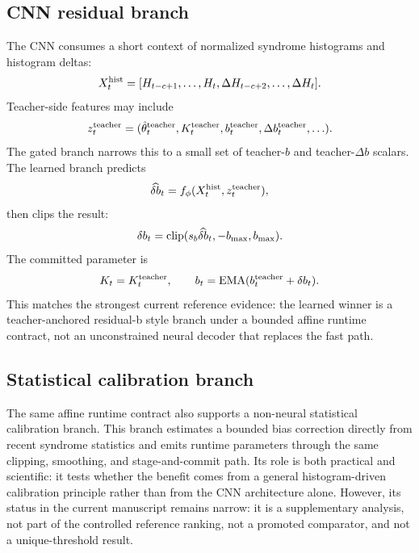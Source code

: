 \documentclass[11pt]{article}
\begin{document}
\subsection{CNN residual branch}

The CNN consumes a short context of normalized syndrome histograms and
histogram deltas:
\begin{equation}
    X_t^{\rm hist}=[H_{t-c+1},\ldots,H_t,\Delta H_{t-c+2},\ldots,\Delta H_t].
\end{equation}
Teacher-side features may include
\begin{equation}
    z_t^{\rm teacher}
    =
    (\hat{\theta}_t^{\rm teacher},
     K_t^{\rm teacher},
     b_t^{\rm teacher},
     \Delta b_t^{\rm teacher},\ldots).
\end{equation}
The gated branch narrows this to a small set of teacher-\(b\) and
teacher-\(\Delta b\) scalars.  The learned branch predicts
\begin{equation}
    \widehat{\delta b}_t=f_\phi(X_t^{\rm hist},z_t^{\rm teacher}),
\end{equation}
then clips the result:
\begin{equation}
    \delta b_t={\rm clip}(s_b\widehat{\delta b}_t,-b_{\max},b_{\max}).
\end{equation}
The committed parameter is
\begin{equation}
    K_t=K_t^{\rm teacher},
    \qquad
    b_t={\rm EMA}(b_t^{\rm teacher}+\delta b_t).
\end{equation}
This matches the strongest current reference evidence: the learned
winner is a teacher-anchored residual-b style branch under a bounded affine
runtime contract, not an unconstrained neural decoder that replaces the fast
path.

\subsection{Statistical calibration branch}

The same affine runtime contract also supports a non-neural statistical
calibration branch.  This branch estimates a bounded bias correction directly
from recent syndrome statistics and emits runtime parameters through the same
clipping, smoothing, and stage-and-commit path.  Its role is both practical and
scientific: it tests whether the benefit comes from a general histogram-driven
calibration principle rather than from the CNN architecture alone.  However,
its status in the current manuscript remains narrow: it is a supplementary
analysis, not part of the controlled reference ranking, not a promoted
comparator, and not a unique-threshold result.
\end{document}
